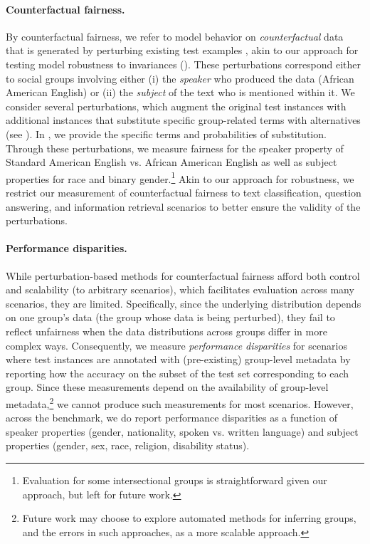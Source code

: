 \paragraph{Counterfactual fairness.}
By counterfactual fairness, we refer to model behavior on \textit{counterfactual} data that is generated by perturbing existing test examples \citep[\cf][]{ma2021dynaboard, qian2022perturbation}, akin to our approach for testing model robustness to invariances ().
These perturbations correspond either to social groups involving either (i) the \textit{speaker} who produced the data (\eg African American English) or (ii) the \textit{subject} of the text who is mentioned within it.
We consider several perturbations, which augment the original test instances with additional instances that substitute specific group-related terms with alternatives (see ).
In , we provide the specific terms and probabilities of substitution. 
Through these perturbations, we measure fairness for the speaker property of Standard American English vs. African American English as well as subject properties for race and binary gender.\footnote{Evaluation for some intersectional groups \citep{crenshaw1989intersectional} is straightforward given our approach, but left for future work.}
Akin to our approach for robustness, we restrict our measurement of counterfactual fairness to text classification, question answering, and information retrieval scenarios to better ensure the validity of the perturbations.

\paragraph{Performance disparities.}
While perturbation-based methods for counterfactual fairness afford both control and scalability (to arbitrary scenarios),
which facilitates evaluation across many scenarios, they are limited.
Specifically, since the underlying distribution depends on one group's data (\ie the group whose data is being perturbed), they fail to reflect unfairness when the data distributions across groups differ in more complex ways.
Consequently, we measure \textit{performance disparities} for scenarios where test instances are annotated with (pre-existing) group-level metadata by reporting how the accuracy on the subset of the test set corresponding to each group.
Since these measurements depend on the availability of group-level metadata,\footnote{Future work may choose to explore automated methods for inferring groups, and the errors in such approaches, as a more scalable approach.} we cannot produce such measurements for most scenarios.
However, across the benchmark, we do report performance disparities as a function of speaker properties (gender, nationality, spoken vs. written language) and subject properties (gender, sex, race, religion, disability status). 

